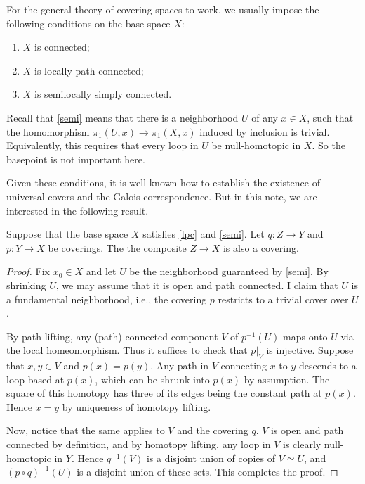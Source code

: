 \documentclass{article}
\begin{document}
\self

For the general theory of covering spaces to work, we usually impose the following conditions on the base space $X$:
\begin{enumerate}[label=(\roman*)]
    \item\label{con} $X$ is connected;
    \item\label{lpc} $X$ is locally path connected;
    \item\label{semi} $X$ is semilocally simply connected.
\end{enumerate}

Recall that \ref{semi} means that there is a neighborhood $U$ of any $x\in X$, such that the homomorphism $\pi_1(U,x)\longrightarrow\pi_1(X,x)$ induced by inclusion is trivial. Equivalently, this requires that every loop in $U$ be null-homotopic in $X$. So the basepoint is not important here.

Given these conditions, it is well known how to establish the existence of universal covers and the Galois correspondence. But in this note, we are interested in the following result.

\begin{theorem}\label{thm}
    Suppose that the base space $X$ satisfies \ref{lpc} and \ref{semi}. Let $q:Z\longrightarrow Y$ and $p:Y\longrightarrow X$ be coverings. The the composite $Z\longrightarrow X$ is also a covering.
\end{theorem}

\begin{proof}
    Fix $x_0\in X$ and let $U$ be the neighborhood guaranteed by \ref{semi}. By shrinking $U$, we may assume that it is open and path connected. I claim that $U$ is a fundamental neighborhood, i.e., the covering $p$ restricts to a trivial cover over $U$.
    
    By path lifting, any (path) connected component $V$ of $p^{-1}(U)$ maps onto $U$ via the local homeomorphism. Thus it suffices to check that $\left.p\right\vert_{V}$ is injective. Suppose that $x,y\in V$ and $p(x)=p(y)$. Any path in $V$ connecting $x$ to $y$ descends to a loop based at $p(x)$, which can be shrunk into $p(x)$ by assumption. The square of this homotopy has three of its edges being the constant path at $p(x)$. Hence $x=y$ by uniqueness of homotopy lifting.

    Now, notice that the same applies to $V$ and the covering $q$. $V$ is open and path connected by definition, and by homotopy lifting, any loop in $V$ is clearly null-homotopic in $Y$. Hence $q^{-1}(V)$ is a disjoint union of copies of $V\simeq U$, and $(p\circ q)^{-1}(U)$ is a disjoint union of these sets. This completes the proof.
\end{proof}
\end{document}
